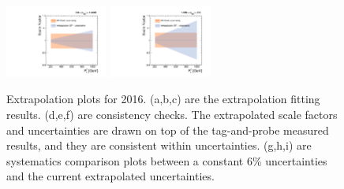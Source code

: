 \begin{figure}[!htbp]
  \includegraphics[width=0.3\textwidth]{fig/Extrapolate_2016_1_Compare.pdf}
  \includegraphics[width=0.3\textwidth]{fig/Extrapolate_2016_2_Compare.pdf}
  \caption{Extrapolation plots for 2016. (a,b,c) are the extrapolation fitting results. (d,e,f) are consistency checks. The extrapolated scale factors and uncertainties are drawn on top of the tag-and-probe measured results, and they are consistent within uncertainties. (g,h,i) are systematics comparison plots between a constant 6\% uncertainties and the current extrapolated uncertainties.}
  \label{fig:Extrapolation}
\end{figure}

